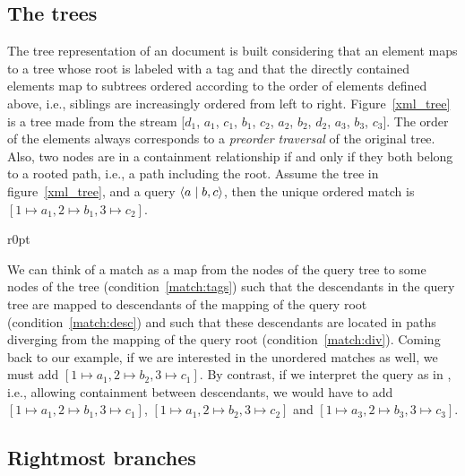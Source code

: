 \subsection{The \XML trees}

The tree representation of an \XML document is built considering that
 an element maps to a tree whose root is labeled with a tag and that
 the directly contained elements map to subtrees ordered according to
 the order of elements defined above, i.e., siblings are increasingly
 ordered from left to right. Figure~\ref{xml_tree} is a tree made from
 the stream [\(d_1\), \(a_1\), \(c_1\), \(b_1\), \(c_2\), \(a_2\),
 \(b_2\), \(d_2\), \(a_3\), \(b_3\), \(c_3\)]. The order of the
 elements always corresponds to a \emph{preorder traversal} of the
 original tree. Also, two nodes are in a containment relationship if
 and only if they both belong to a rooted path, i.e., a path including
 the root. Assume the tree in figure~\ref{xml_tree}, and a query
 \(\langle a \mid b,c\rangle\), then the unique ordered match is \([1 \mapsto
 a_1, 2 \mapsto b_1, 3 \mapsto c_2]\).
\begin{wrapfigure}[11]{r}{0pt}
\centering
{}
\caption{\XML tree with tags \(a\), \(b\), \(c\) and \(d\).}
\label{xml_tree}
\end{wrapfigure}
\noindent We can think of a match as a map from the nodes of the query
 tree to some nodes of the \XML tree (condition~\eqref{match:tags})
 such that the descendants in the query tree are mapped to descendants
 of the mapping of the query root (condition~\eqref{match:desc}) and
 such that these descendants are located in paths diverging from the
 mapping of the query root (condition~\eqref{match:div}). Coming back
 to our example, if we are interested in the unordered matches as
 well, we must add \([1 \mapsto a_1, 2 \mapsto b_2, 3 \mapsto
 c_1]\). By contrast, if we interpret the query as in \XPath, i.e.,
 allowing containment between descendants, we would have to add \([1
 \mapsto a_1, 2 \mapsto b_1, 3 \mapsto c_1]\), \([1 \mapsto a_1, 2
 \mapsto b_2, 3 \mapsto c_2]\) and \([1 \mapsto a_3, 2 \mapsto b_3, 3
 \mapsto c_3]\).

\subsection{Rightmost branches}

